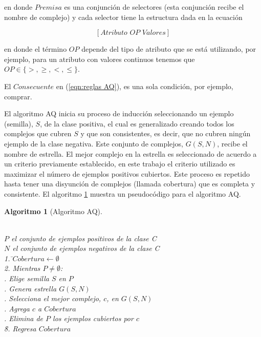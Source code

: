 \documentclass[12pt]{report}
\theoremstyle{break}
\theoremstyle{break}
\newtheorem{algoritmo}{Algoritmo}[chapter]
\begin{document}
en donde $Premisa$ es una conjunción de selectores (esta conjunción recibe el nombre de complejo) y cada selector tiene la estructura dada en la ecuación 

\begin{equation} \label{eqn:condicion AQ}
\left[Atributo\,\, OP\,\, Valores \right]
\end{equation}

en donde el término $OP$ depende del tipo de atributo que se está utilizando, por ejemplo, para un atributo con valores continuos tenemos que $OP \in \{>, \geq, <, \leq\}$.

El $Consecuente$ en (\ref{eqn:reglas AQ}), es una sola condición, por ejemplo, comprar.

El algoritmo AQ inicia su proceso de inducción seleccionando un ejemplo (semilla), $S$, de la clase positiva, el cual es generalizado creando todos los complejos que cubren $S$ y que son consistentes, es decir, que no cubren ningún ejemplo de la clase negativa. Este conjunto de complejos, $G(S,N)$, recibe el nombre de estrella. El mejor complejo en la estrella es seleccionado de acuerdo a un criterio previamente establecido, en este trabajo el criterio utilizado es maximizar el número de ejemplos positivos cubiertos. Este proceso es repetido hasta tener una disyunción de complejos (llamada cobertura) que es completa y consistente. El algoritmo \ref{algo:AQ} muestra un pseudocódigo para el algoritmo AQ.

\begin{algoritmo}[Algoritmo AQ]
\begin{tabbing}
\\$P$ el conjunto de ejemplos positivos de la clase C
\\$N$ el conjunto de ejemplos negativos de la clase C\\
1. \=$Cobertura\leftarrow \emptyset $ \\
2. Mientras $P \neq \emptyset$:\\
 . Elige semilla $S$ en $P$\\
 . Genera estrella $G(S,N)$\\
 . Selecciona el mejor complejo, $c$, en $G(S,N)$\\
 . Agrega $c$ a $Cobertura$\\
 . Elimina de $P$ los ejemplos cubiertos por $c$\\
\=8. Regresa $Cobertura$
\end{tabbing}
\label{algo:AQ}
\end{algoritmo}
\end{document}
